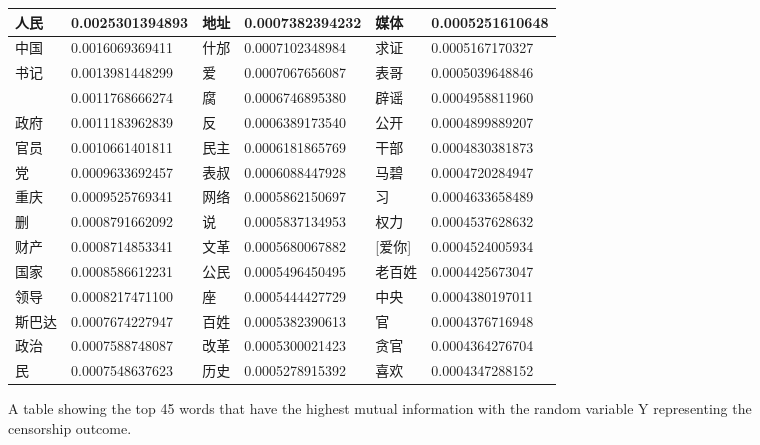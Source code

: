 \documentclass{article} %
\begin{document}
\begin{CJK*}{UTF8}{gbsn}
\begin{figure}[!htb]
	\begin{center}
		    \begin{tabular}{ | l | l | l | l | l | l |}
		    \hline
		    人民 & 0.0025301394893 & 地址 & 0.0007382394232& 媒体 & 0.0005251610648 \\ \hline
		    中国 & 0.0016069369411 & 什邡 & 0.0007102348984 & 求证 & 0.0005167170327\\ \hline
		    书记 & 0.0013981448299 & 爱   &0.0007067656087 & 表哥& 0.0005039648846\\ \hline
		  [话筒] & 0.0011768666274 & 腐   & 0.0006746895380& 辟谣& 0.0004958811960\\\hline
		   	政府 & 0.0011183962839 & 反   & 0.0006389173540& 公开 & 0.0004899889207\\\hline
		    官员 & 0.0010661401811 & 民主 & 0.0006181865769 & 干部 & 0.0004830381873\\\hline
		    党 & 0.0009633692457 & 表叔 & 0.0006088447928 & 马碧 & 0.0004720284947\\\hline
		    重庆 & 0.0009525769341 & 网络 & 0.0005862150697 & 习 & 0.0004633658489\\\hline
		    删 & 0.0008791662092 & 说 & 0.0005837134953 & 权力 & 0.0004537628632\\\hline
		    财产 & 0.0008714853341 & 文革 & 0.0005680067882 & [爱你] & 0.0004524005934\\\hline
		    国家 & 0.0008586612231 & 公民 & 0.0005496450495 & 老百姓 & 0.0004425673047\\\hline
		    领导 & 0.0008217471100 & 座 & 0.0005444427729 & 中央 & 0.0004380197011\\\hline
		    斯巴达 & 0.0007674227947 & 百姓 & 0.0005382390613 & 官& 0.0004376716948\\\hline
		    政治 & 0.0007588748087 & 改革 & 0.0005300021423 & 贪官 & 0.0004364276704\\\hline
		    民 & 0.0007548637623 & 历史 & 0.0005278915392 & 喜欢 & 0.0004347288152\\\hline
		    \end{tabular}
	\end{center}
\caption{A table showing the top 45 words that have the highest mutual information with the random variable Y representing the censorship outcome.}
\vspace{-10pt}
\end{figure}

\end{CJK*}
\end{document}
